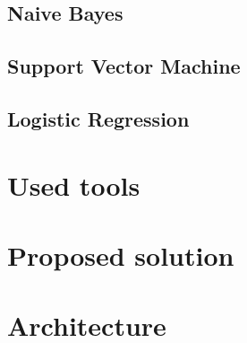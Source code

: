 \documentclass{article}
\begin{document}
\subsection{Naive Bayes}
\subsection{Support Vector Machine}
\subsection{Logistic Regression}

\section{Used tools}

\section{Proposed solution}

\section{Architecture}
\end{document}
